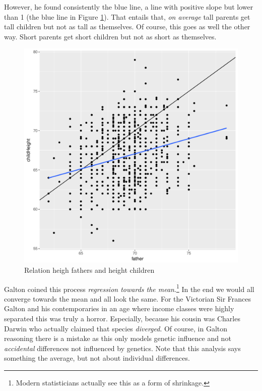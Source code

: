 \documentclass[
]{book}
\begin{document}
However, he found consistently the blue line, a line with positive slope but lower than 1 (the blue line in Figure \ref{fig:galton1}). That entails that, \emph{on average} tall parents get tall children but not as tall as themselves. Of course, this goes as well the other way. Short parents get short children but not as short as themselves.

\begin{figure}
\includegraphics[width=7in]{./figures/Galton1} \caption{Relation heigh fathers and height children}\label{fig:galton1}
\end{figure}

Galton coined this process \emph{regression towards the mean}.\footnote{Modern statisticians actually see this as a form of shrinkage.} In the end we would all converge towards the mean and all look the same. For the Victorian Sir Frances Galton and his contemporaries in an age where income classes were highly separated this was truly a horror. Especially, because his cousin was Charles Darwin who actually claimed that species \emph{diverged}. Of course, in Galton reasoning there is a mistake as this only models genetic influence and not \emph{accidental} differences not influenced by genetics. Note that this analysis says something the average, but not about individual differences.
\end{document}
